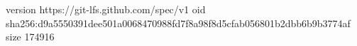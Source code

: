 version https://git-lfs.github.com/spec/v1
oid sha256:d9a5550391dee501a0068470988fd7f8a98f8d5cfab056801b2dbb6b9b3774af
size 174916
